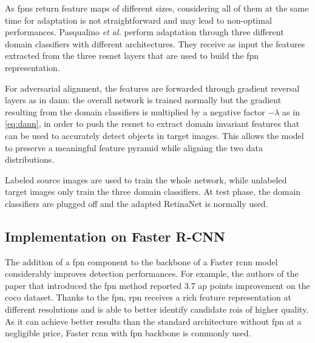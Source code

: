 \documentclass[%
    corpo=12pt,
    twoside,
    stile=classica,   
    tipotesi=magistrale,
    evenboxes,
    english,
	numerazioneromana,
]{toptesi}
\begin{document}
\bigskip
As \glspl{fpn} return feature maps of different sizes, considering all of them at the same time for adaptation is not straightforward and may lead to non-optimal performances. Pasqualino \textit{et al.}\cite{pasqualino2020unsupervised} perform adaptation through three different domain classifiers with different architectures. They receive as input the features extracted from the three \gls{resnet} layers that are used to build the \gls{fpn} representation.

For adversarial alignment, the features are forwarded through gradient reversal layers as in \gls{dann}: the overall network is trained normally but the gradient resulting from the domain classifiers is multiplied by a negative factor $-\lambda$ as in \eqref{eq:dann}, in order to push the \gls{resnet} to extract domain invariant features that can be used to accurately detect objects in target images. This allows the model to preserve a meaningful feature pyramid while aligning the two data distributions.

\medskip
Labeled source images are used to train the whole network, while unlabeled target images only train the three domain classifiers. At test phase, the domain classifiers are plugged off and the adapted RetinaNet is normally used.

\subsection{Implementation on Faster R-CNN}
The addition of a \gls{fpn} component to the backbone of a Faster \gls{rcnn} model considerably improves detection performances. For example, the authors of the paper that introduced the \gls{fpn} method reported 3.7 \gls{ap} points improvement on the \gls{coco} dataset\cite{lin2017feature}. Thanks to the \gls{fpn}, \gls{rpn} receives a rich feature representation at different resolutions and is able to better identify candidate \glspl{roi} of higher quality. As it can achieve better results than the standard architecture without \gls{fpn} at a negligible price, Faster \gls{rcnn} with \gls{fpn} backbone is commonly used. 
\end{document}
